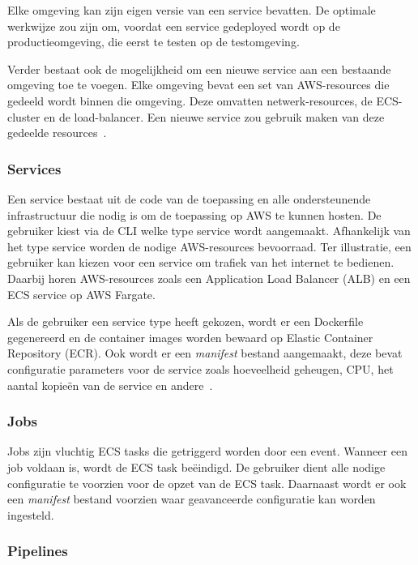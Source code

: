 Elke omgeving kan zijn eigen versie van een service bevatten.
De optimale werkwijze zou zijn om, voordat een service gedeployed wordt op de productieomgeving, die eerst te testen op de testomgeving.

Verder bestaat ook de mogelijkheid om een nieuwe service aan een bestaande omgeving toe te voegen.
Elke omgeving bevat een set van AWS-resources die gedeeld wordt binnen die omgeving.
Deze omvatten netwerk-resources, de ECS-cluster en de load-balancer.
Een nieuwe service zou gebruik maken van deze gedeelde resources~\autocite{Karakus2022}.

\subsubsection{Services}

Een service bestaat uit de code van de toepassing en alle ondersteunende infrastructuur die nodig is om de toepassing op AWS te kunnen hosten.
De gebruiker kiest via de CLI welke type service wordt aangemaakt.
Afhankelijk van het type service worden de nodige AWS-resources bevoorraad.
Ter illustratie, een gebruiker kan kiezen voor een service om trafiek van het internet te bedienen.
Daarbij horen AWS-resources zoals een Application Load Balancer (ALB) en een ECS service op AWS Fargate.

Als de gebruiker een service type heeft gekozen, wordt er een Dockerfile gegenereerd en de container images worden bewaard op Elastic Container Repository (ECR).
Ook wordt er een \emph{manifest} bestand aangemaakt, deze bevat configuratie parameters voor de service zoals hoeveelheid geheugen, CPU, het aantal kopieën van de service en andere~\autocite{Karakus2022}.

\subsubsection{Jobs}

Jobs zijn vluchtig ECS tasks die getriggerd worden door een event.
Wanneer een job voldaan is, wordt de ECS task beëindigd.
De gebruiker dient alle nodige configuratie te voorzien voor de opzet van de ECS task.
Daarnaast wordt er ook een \emph{manifest} bestand voorzien waar geavanceerde configuratie kan worden ingesteld.

\subsubsection{Pipelines}

